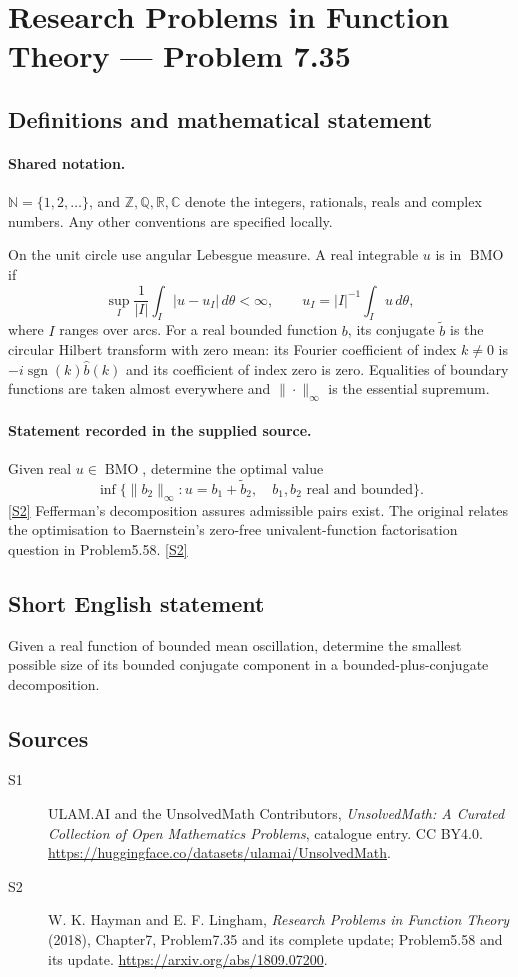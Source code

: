 \documentclass[11pt]{article}
\newcommand{\sref}[2]{\hyperlink{source:#1:#2}{[S#2]}}
\begin{document}
\section{Research Problems in Function Theory — Problem 7.35}\label{statement}

\subsection{Definitions and mathematical statement}

\paragraph{Shared notation.}$\mathbb N=\{1,2,\ldots\}$, and $\mathbb Z,\mathbb Q,\mathbb R,\mathbb C$ denote the integers, rationals, reals and complex numbers. Any other conventions are specified locally.


On the unit circle use angular Lebesgue measure. A real integrable $u$ is in $\operatorname{BMO}$ if
\[\sup_I\frac1{|I|}\int_I|u-u_I|\,d\theta<\infty,\qquad
u_I=|I|^{-1}\int_Iu\,d\theta,
\]
where $I$ ranges over arcs. For a real bounded function $b$, its conjugate $\widetilde b$ is the circular Hilbert transform with zero mean: its Fourier coefficient of index $k\ne0$ is $-i\operatorname{sgn}(k)\widehat b(k)$ and its coefficient of index zero is zero. Equalities of boundary functions are taken almost everywhere and $\|\cdot\|_\infty$ is the essential supremum.

\paragraph{Statement recorded in the supplied source.}
Given real $u\in\operatorname{BMO}$, determine the optimal value
\[\inf\{\|b_2\|_\infty:u=b_1+\widetilde b_2,\quad b_1,b_2\text{ real and bounded}\}.\] \sref{statement}{2}
Fefferman's decomposition assures admissible pairs exist. The original relates the optimisation to Baernstein's zero-free univalent-function factorisation question in Problem5.58. \sref{statement}{2}
\subsection{Short English statement}
Given a real function of bounded mean oscillation, determine the smallest possible size of its bounded conjugate component in a bounded-plus-conjugate decomposition.
\subsection{Sources}
\begin{description}
\item[\hypertarget{source:statement:1}{S1}] ULAM.AI and the UnsolvedMath Contributors, \emph{UnsolvedMath: A Curated Collection of Open Mathematics Problems}, catalogue entry. CC BY4.0. \url{https://huggingface.co/datasets/ulamai/UnsolvedMath}.
\item[\hypertarget{source:statement:2}{S2}] W. K. Hayman and E. F. Lingham, \emph{Research Problems in Function Theory} (2018), Chapter7, Problem7.35 and its complete update; Problem5.58 and its update. \url{https://arxiv.org/abs/1809.07200}.
\end{description}
\label{end:statement}
\end{document}
